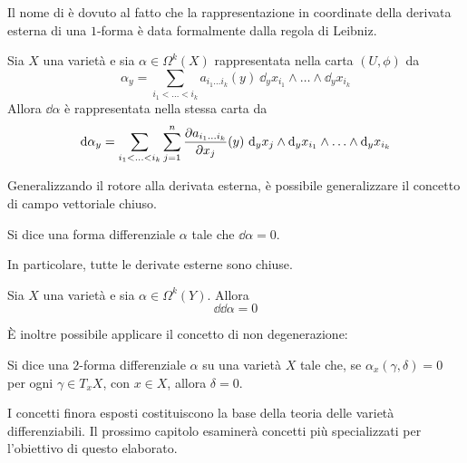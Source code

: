 Il nome di  è dovuto al fatto che la rappresentazione in coordinate della derivata esterna di una $1$-forma è data formalmente dalla regola di Leibniz.
\begin{theorem} \label{thm:derivCoords}
  Sia $X$ una varietà e sia $\alpha \in \Omega^k(X)$ rappresentata nella carta $(U, \phi)$ da \begin{equation*}
    \alpha_y = \sum_{i_1 < \ldots < i_k} a_{i_1\ldots i_k}(y)\ \dd_y x_{i_1} \wedge \ldots \wedge \dd_y x_{i_k}
    \end{equation*}
    Allora $\dd{\alpha}$ è rappresentata nella stessa carta da
    \begin{equation*}
      \dd{\alpha_y} = \sum_{i_1 < \ldots < i_k} \sum_{j=1}^n \pdv{a_{i_1\ldots i_k}}{x_j}()(y)\ \dd_y x_{j} \wedge \dd_y x_{i_1} \wedge \ldots \wedge \dd_y x_{i_k}
      \end{equation*}
\end{theorem}

Generalizzando il rotore alla derivata esterna, è possibile generalizzare il concetto di campo vettoriale chiuso.
\begin{definition}
  Si dice  una forma differenziale $\alpha$ tale che $\dd \alpha = 0$. 
\end{definition}
In particolare, tutte le derivate esterne sono chiuse.
\begin{theorem}
  Sia $X$ una varietà e sia $\alpha \in \Omega^k(Y)$. Allora 
  \begin{equation*}
  \dd{\dd{\alpha}} = 0
  \end{equation*} 
\end{theorem}

È inoltre possibile applicare il concetto di non degenerazione:
\begin{definition}
  Si dice  una $2$-forma differenziale $\alpha$ su una varietà $X$ tale che, se $\alpha_x (\gamma, \delta) = 0$ per ogni $\gamma \in T_x X$, con $x \in  X$, allora $\delta = 0$.
\end{definition}

I concetti finora esposti costituiscono la base della teoria delle varietà differenziabili. Il prossimo capitolo esaminerà concetti più specializzati per l'obiettivo di questo elaborato.